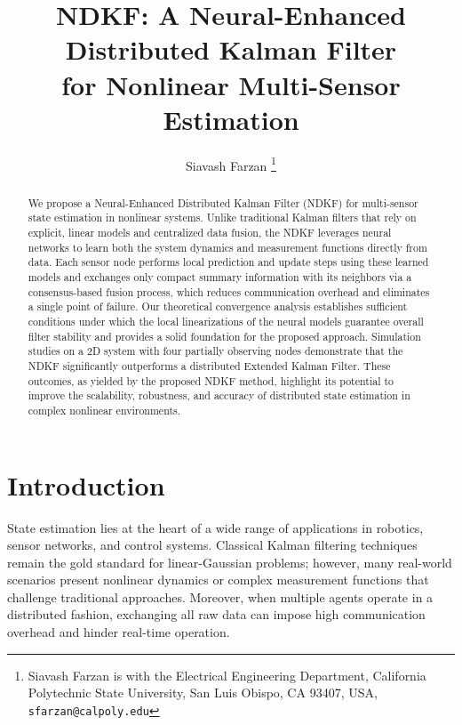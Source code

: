 \documentclass[letterpaper, 10 pt, conference]{ieeeconf}
\title{\LARGE \bf NDKF: A Neural-Enhanced Distributed Kalman Filter \\ for Nonlinear Multi-Sensor Estimation}
\author{Siavash Farzan%
\thanks{Siavash Farzan is with the Electrical Engineering Department, California Polytechnic State University, San Luis Obispo, CA 93407, USA, {\tt\small sfarzan@calpoly.edu}}%
}
\begin{document}
\maketitle
\thispagestyle{empty}
\pagestyle{empty}

\begin{abstract}
We propose a Neural-Enhanced Distributed Kalman Filter (NDKF) for multi-sensor state estimation in nonlinear systems. Unlike traditional Kalman filters that rely on explicit, linear models and centralized data fusion, the NDKF leverages neural networks to learn both the system dynamics and measurement functions directly from data. Each sensor node performs local prediction and update steps using these learned models and exchanges only compact summary information with its neighbors via a consensus-based fusion process, which reduces communication overhead and eliminates a single point of failure. Our theoretical convergence analysis establishes sufficient conditions under which the local linearizations of the neural models guarantee overall filter stability and provides a solid foundation for the proposed approach. Simulation studies on a 2D system with four partially observing nodes demonstrate that the NDKF significantly outperforms a distributed Extended Kalman Filter.
These outcomes, as yielded by the proposed NDKF method, highlight its potential to improve the scalability, robustness, and accuracy of distributed state estimation in complex nonlinear environments.
\end{abstract}

\section{Introduction}
\label{sec:introduction}

State estimation lies at the heart of a wide range of applications in robotics, sensor networks, and control systems. Classical Kalman filtering techniques remain the gold standard for linear-Gaussian problems; however, many real-world scenarios present nonlinear dynamics or complex measurement functions that challenge traditional approaches. Moreover, when multiple agents operate in a distributed fashion, exchanging all raw data can impose high communication overhead and hinder real-time operation.
\end{document}
